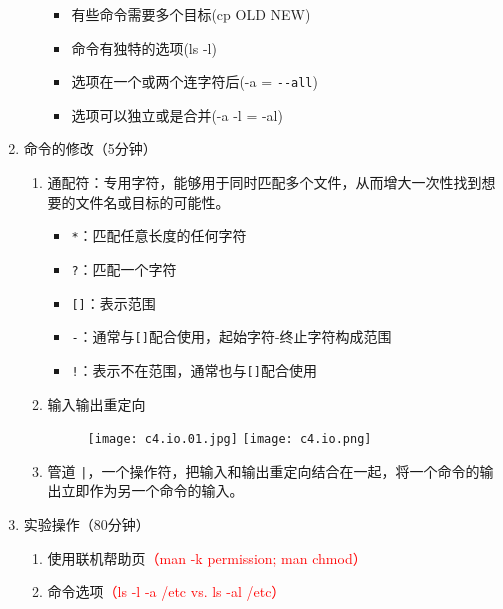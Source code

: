 \documentclass{TIJMUjiaoanSY}
\begin{document}
\begin{enumerate}
\begin{enumerate}
\begin{itemize}
	  \item 有些命令需要多个目标(cp OLD NEW)
	  \item 命令有独特的选项(ls -l)
	  \item 选项在一个或两个连字符后(-a = \verb|--all|)
	  \item 选项可以独立或是合并(-a -l = -al)
        \end{itemize}
    \end{enumerate}
  \item 命令的修改（5分钟）
    \begin{enumerate}
      \item 通配符：专用字符，能够用于同时匹配多个文件，从而增大一次性找到想要的文件名或目标的可能性。
	\begin{itemize}
	  \item \verb|*|：匹配任意长度的任何字符
	  \item \verb|?|：匹配一个字符
	  \item \verb|[]|：表示范围
	  \item \verb|-|：通常与\verb|[]|配合使用，起始字符-终止字符构成范围
	  \item \verb|!|：表示不在范围，通常也与\verb|[]|配合使用
	\end{itemize}
      \item 输入输出重定向
	\vspace*{-10pt}
	\begin{figure}[h]
	  \centering
	  \texttt{[image: c4.io.01.jpg]}
	  \quad
	  \texttt{[image: c4.io.png]}
	\end{figure}
	\vspace*{-10pt}
      \item 管道
	\verb=|=，一个操作符，把输入和输出重定向结合在一起，将一个命令的输出立即作为另一个命令的输入。
    \end{enumerate}
  \item 实验操作（80分钟）
    \begin{enumerate}
      \item 使用联机帮助页\textcolor{red}{（man -k permission; man chmod）}
      \item 命令选项\textcolor{red}{（ls -l -a /etc vs. ls -al /etc）}

\otherTail
\newpage
\otherHeader


\end{enumerate}
\end{enumerate}
\end{document}
